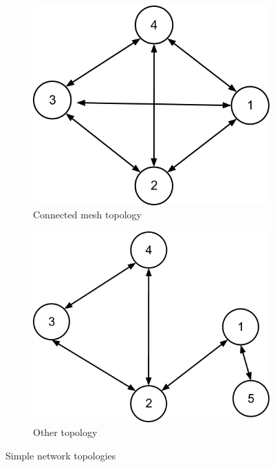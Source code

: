 \documentclass[12pt]{article}
\begin{document}
\begin{figure}[htp]
    \begin{subfigure}[b]{0.5\textwidth}
        \centering
        \includegraphics[scale=0.25]{images/con-mesh-topo.png}
        \caption{Connected mesh topology}
        \label{fig:con_mesh_topology}
    \end{subfigure}
    \begin{subfigure}[b]{0.5\textwidth}
        \includegraphics[scale=0.25]{images/other-topo.png}
        \caption{Other topology}
        \label{fig:other_topology}
    \end{subfigure}
    \caption{Simple network topologies}
\end{figure}
\end{document}

